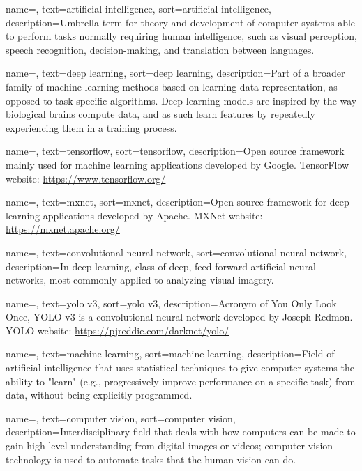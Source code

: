 {
	name=,
	text=artificial intelligence,
	sort=artificial intelligence,
	description={Umbrella term for theory and development of computer systems able to perform tasks normally requiring human intelligence, such as visual perception, speech recognition, decision-making, and translation between languages.}
}

{
	name=,
	text=deep learning,
	sort=deep learning,
	description={Part of a broader family of machine learning methods based on learning data representation, as opposed to task-specific algorithms. Deep learning models are inspired by the way biological brains compute data, and as such learn features by repeatedly experiencing them in a training process.}
}

{
	name=,
	text=tensorflow,
	sort=tensorflow,
	description={Open source framework mainly used for machine learning applications developed by Google. TensorFlow website: \url{https://www.tensorflow.org/}}
}

{
	name=,
	text=mxnet,
	sort=mxnet,
	description={Open source framework for deep learning applications developed by Apache. MXNet website: \url{https://mxnet.apache.org/}}
}

{
	name=,
	text=convolutional neural network,
	sort=convolutional neural network,
	description={In deep learning, class of deep, feed-forward artificial neural networks, most commonly applied to analyzing visual imagery.}
}

{
	name=,
	text=yolo v3,
	sort=yolo v3,
	description={Acronym of You Only Look Once, YOLO v3 is a convolutional neural network developed by Joseph Redmon. YOLO website: \url{https://pjreddie.com/darknet/yolo/}}
}

{
	name=,
	text=machine learning,
	sort=machine learning,
	description={Field of artificial intelligence that uses statistical techniques to give computer systems the ability to "learn" (e.g., progressively improve performance on a specific task) from data, without being explicitly programmed.}
}

{
	name=,
	text=computer vision,
	sort=computer vision,
	description={Interdisciplinary field that deals with how computers can be made to gain high-level understanding from digital images or videos; computer vision technology is used to automate tasks that the human vision can do.}
}

